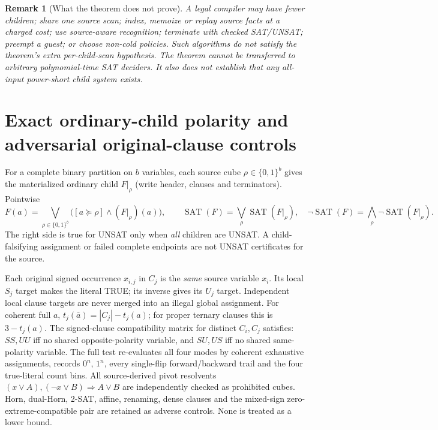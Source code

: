 \documentclass[11pt]{article}
\newtheorem{remark}[theorem]{Remark}
\newcommand{\SAT}{\operatorname{SAT}}
\begin{document}
\begin{remark}[What the theorem does not prove]
A legal compiler may have fewer children; share one source scan; index, memoize or replay source facts at a charged cost; use source-aware recognition; terminate with checked SAT/UNSAT; preempt a guest; or choose non-cold policies. Such algorithms do \emph{not} satisfy the theorem's extra per-child-scan hypothesis. The theorem cannot be transferred to arbitrary polynomial-time SAT deciders. It also does not establish that any all-input power-short child system exists.
\end{remark}

\section{Exact ordinary-child polarity and adversarial original-clause controls}
For a complete binary partition on $b$ variables, each source cube $\rho\in\{0,1\}^{b}$ gives the materialized ordinary child $F|_\rho$ (write header, clauses and terminators). Pointwise
\[
F(a)=\bigvee_{\rho\in\{0,1\}^{b}}\bigl([a\succeq\rho]\wedge (F|_\rho)(a)\bigr),
\qquad
\SAT(F)=\bigvee_\rho\SAT(F|_\rho),
\quad
\neg\SAT(F)=\bigwedge_\rho\neg\SAT(F|_\rho).
\tag{6}
\]
The right side is true for UNSAT only when \emph{all} children are UNSAT. A child-falsifying assignment or failed complete endpoints are not UNSAT certificates for the source.

Each original signed occurrence $x_{i,j}$ in $C_j$ is the \emph{same} source variable $x_i$. Its local $S_j$ target makes the literal TRUE; its inverse gives its $U_j$ target. Independent local clause targets are never merged into an illegal global assignment. For coherent full $a$, $t_j(\bar a)=|C_j|-t_j(a)$; for proper ternary clauses this is $3-t_j(a)$. The signed-clause compatibility matrix for distinct $C_i,C_j$ satisfies: $SS,UU$ iff no shared opposite-polarity variable, and $SU,US$ iff no shared same-polarity variable. The full test re-evaluates all four modes by coherent exhaustive assignments, records $0^n$, $1^n$, every single-flip forward/backward trail and the four true-literal count bins. All source-derived pivot resolvents $(x\vee A),(\neg x\vee B)\Rightarrow A\vee B$ are independently checked as prohibited cubes. Horn, dual-Horn, 2-SAT, affine, renaming, dense clauses and the mixed-sign zero-extreme-compatible pair are retained as adverse controls. None is treated as a lower bound.
\end{document}

